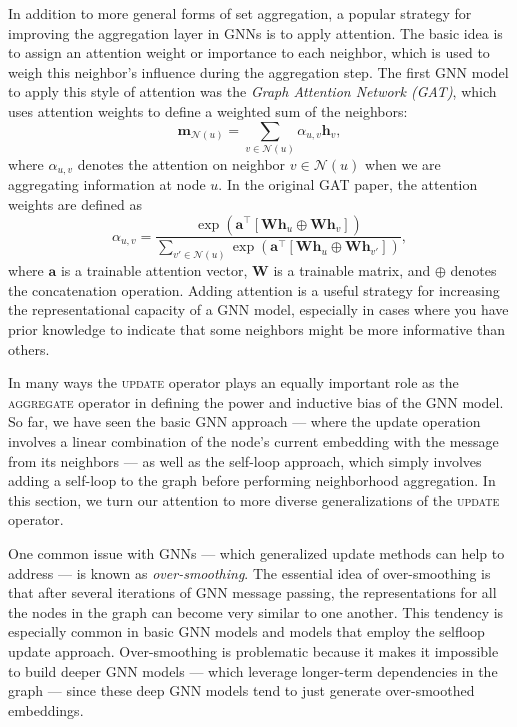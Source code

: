 \documentclass[10pt]{book}
\let\defaultmarginpar\marginpar
\renewcommand\marginpar[2][]{\defaultmarginpar{\itshape\color{gray}#2}}
\begin{document}
In addition to more general forms of set aggregation, a popular strategy for improving the aggregation layer in GNNs is to apply attention. The basic idea is to assign an attention weight or importance to each neighbor, which is used to weigh this neighbor's influence during the aggregation step. The first GNN model to apply this style of attention was the \emph{Graph Attention Network (GAT)}\marginpar{Graph Attention Network (GAT)}, which uses attention weights to define a weighted sum of the neighbors:
\begin{equation}
    \mathbf m_{\mathcal N(u)} = \sum_{v \in \mathcal N(u)} \alpha_{u,v} \mathbf h_v,
\end{equation}
where $\alpha_{u,v}$ denotes the attention on neighbor $v \in \mathcal N(u)$ when we are aggregating information at node $u$. In the original GAT paper, the attention weights are defined as
\begin{equation}
    \alpha_{u,v} = \frac{\exp \left(\mathbf a^\top[\mathbf{Wh}_u \oplus \mathbf{Wh}_v] \right)}{\sum_{v' \in \mathcal N(u)} \exp \left( \mathbf a^\top [\mathbf{Wh}_u \oplus \mathbf{Wh}_{v'}] \right)},
\end{equation}
where $\mathbf a$ is a trainable attention vector, $\mathbf W$ is a trainable matrix, and $\oplus$ denotes the concatenation operation. Adding attention is a useful strategy for increasing the representational capacity of a GNN model, especially in cases where you have prior knowledge to indicate that some neighbors might be more informative than others. 

In many ways the \textsc{update} operator plays an equally important role as the \textsc{aggregate} operator in defining the power and inductive bias of the GNN model. So far, we have seen the basic GNN approach --- where the update operation involves a linear combination of the node's current embedding with the message from its neighbors --- as well as the self-loop approach, which simply involves adding a self-loop to the graph before performing neighborhood aggregation. In this section, we turn our attention to more diverse generalizations of the \textsc{update} operator.

One common issue with GNNs --- which generalized update methods can help to address --- is known as \emph{over-smoothing}\marginpar{over-smoothing}. The essential idea of over-smoothing is that after several iterations of GNN message passing, the representations for all the nodes in the graph can become very similar to one another. This tendency is especially common in basic GNN models and models that employ the selfloop update approach. Over-smoothing is problematic because it makes it impossible to build deeper GNN models --- which leverage longer-term dependencies in the graph --- since these deep GNN models tend to just generate over-smoothed embeddings.
\end{document}
